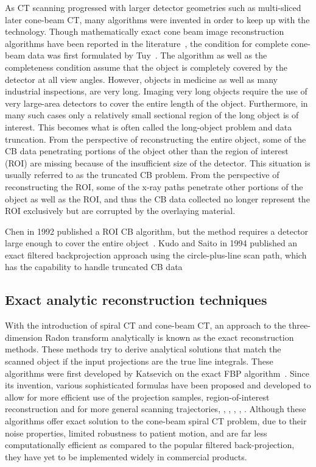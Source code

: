 As CT scanning progressed with larger detector geometries such as multi-sliced later cone-beam CT, many algorithms were invented in order to keep up with the technology.  Though mathematically exact cone beam image reconstruction algorithms have been reported in the literature~\citep{Tuy1983, Smith1985, Grangeat1991}, the condition for complete cone-beam data was first formulated by Tuy~\citep{Tuy1983}.  The algorithm as well as the completeness condition assume that the object is completely covered by the detector at all view angles.  However, objects in medicine as well as many industrial inspections, are very long.  Imaging very long objects require the use of very large-area detectors to cover the entire length of the object.  Furthermore, in many such cases only a relatively small sectional region of the long object is of interest.  This becomes what is often called the long-object problem and data truncation.  From the perspective of reconstructing the entire object, some of the CB data penetrating portions of the object other than the region of interest (ROI) are missing because of the insufficient size of the detector.  This situation is usually referred to as the truncated CB problem.  From the perspective of reconstructing the ROI, some of the x-ray paths penetrate other portions of the object as well as the ROI, and thus the CB data collected no longer represent the ROI exclusively but are corrupted by the overlaying material.  

Chen in 1992 published a ROI CB algorithm, but the method requires a detector large enough to cover the entire object~\citep{Chen1992}.  Kudo and Saito in 1994 published an exact filtered backprojection approach using the circle-plus-line scan path, which has the capability to handle truncated CB data~\citep{Kudo1994}




\subsection{Exact analytic reconstruction techniques}
With the introduction of spiral CT and cone-beam CT, an approach to the three-dimension Radon transform analytically is known as the exact reconstruction methods.  These methods try to derive analytical solutions that match the scanned object if the input projections are the true line integrals. These algorithms were first developed by Katsevich on the exact FBP algorithm~\citep{Katsevich2002, Katsevich2003, Katsevich2002SIAM}.  Since its invention, various sophisticated formulas have been proposed and developed to allow for more efficient use of the projection samples, region-of-interest reconstruction and for more general scanning trajectories\citep{Chen2003}, \citep{Pan2004}, \citep{Zou2004}, \citep{Ye2005}, \citep{Zhuang2006}, \citep{Wang2008}.  Although these algorithms offer exact solution to the cone-beam spiral CT problem, due to their noise properties, limited robustness to patient motion, and are far less computationally efficient as compared to the popular filtered back-projection, they have yet to be implemented widely in commercial products.

